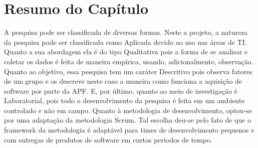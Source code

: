 \section{Resumo do Capítulo}
A pesquisa pode ser classificada de diversas formas. Neste a projeto, a natureza da pesquisa pode ser classificada como Aplicada devido ao uso nas áreas de TI. Quanto a sua abordagem ela é do tipo Qualitativa pois a forma de se analisar e coletar os dados é feita de maneira empírica, usando, adicionalmente, observação. Quanto ao objetivo, essa pesquisa tem um caráter Descritivo pois observa fatores de um grupo e os descreve neste caso a maneira como funciona a aquisição de software por parte da APF. E, por último, quanto ao meio de investigação é Laboratorial, pois todo o desenvolvimento da pesquisa é feita em um ambiente controlado e não em campo.
Quanto à metodologia de desenvolvimento, optou-se por uma adaptação da metodologia Scrum. Tal escolha deu-se pelo fato de que o framework da metodologia é adaptável para times de desenvolvimento pequenos e com entregas de produtos de software em curtos períodos de tempo.
